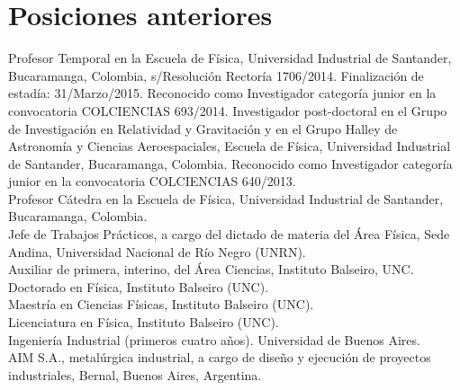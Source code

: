 \section*{Posiciones anteriores}
\noindent
{} Profesor Temporal en la Escuela de Física, Universidad Industrial de Santander, Bucaramanga, Colombia, s/Resolución Rectoría 1706/2014. Finalización de estadía: 31/Marzo/2015. Reconocido como Investigador categoría junior en la convocatoria COLCIENCIAS 693/2014.
 Investigador post-doctoral en el Grupo de Investigación en Relatividad y Gravitación y en el Grupo Halley de Astronomía y Ciencias Aeroespaciales, Escuela de Física, Universidad Industrial de Santander, Bucaramanga, Colombia. Reconocido como Investigador categoría junior en la convocatoria COLCIENCIAS 640/2013.\\
 Profesor Cátedra en la Escuela de Física, Universidad Industrial de Santander, Bucaramanga, Colombia.\\
 Jefe de Trabajos Prácticos, a cargo del dictado de materia del Área Física, Sede Andina, Universidad Nacional de Río Negro (UNRN).\\
 Auxiliar de primera, interino, del Área Ciencias, Instituto Balseiro, UNC.\\
Doctorado en Física, Instituto Balseiro (UNC).\\
Maestría en Ciencias Físicas, Instituto Balseiro (UNC).\\
Licenciatura en Física, Instituto Balseiro (UNC).\\
Ingeniería Industrial (primeros cuatro años). Universidad de Buenos Aires.\\
AIM S.A., metalúrgica industrial, a cargo de diseño y ejecución de proyectos industriales, Bernal, Buenos Aires, Argentina.\\
\fi

\ifeng

